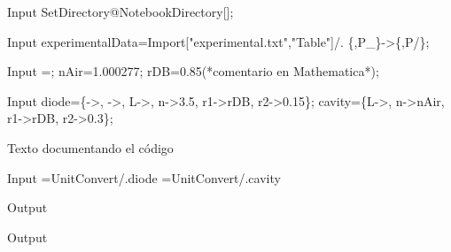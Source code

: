 \documentclass[../Main.tex]{subfiles}
\begin{document}
\label{chap:code}

\begin{mmaCell}[morepattern={x_, x}]{Input}
SetDirectory@NotebookDirectory[];
\end{mmaCell}


\begin{mmaCell}[morepattern={T_,P_}]{Input}
experimentalData=Import["experimental.txt","Table"]/.
   \{,P_\}->\{,P/\};
\end{mmaCell}

 
\begin{mmaCell}[moredefined={nAir, rDB}]{Input}
=;
nAir=1.000277;
rDB=0.85(*comentario en Mathematica*);
\end{mmaCell}

\begin{mmaCell}[addtoindex=2]{Input}
diode=\{->, 
   ->,
   L->\mmaUnit{0.282mm},
   n->3.5,
   r1->rDB, r2->0.15\};
cavity=\{L->\mmaUnit{50mm},
   n->nAir, r1->rDB, r2->0.3\};	
\end{mmaCell}

Texto documentando el código

\begin{mmaCell}[addtoindex=1,moredefined={f}]{Input}
=UnitConvert/.diode
=UnitConvert/.cavity
\end{mmaCell}

\begin{mmaCell}{Output}
\end{mmaCell}

\begin{mmaCell}{Output}
\end{mmaCell}
\end{document}
